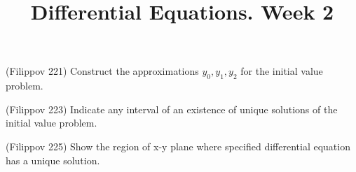 \documentclass[14pt]{exam}
\title{Differential Equations. Week 2}
\date{}
\begin{document}
	\maketitle
	
	\begin{questions}
		\question
		(Filippov 221) Construct the approximations $y_0, y_1, y_2$ for the initial value problem. 
		
		\question
		(Filippov 223) Indicate any interval of an existence of unique solutions of the initial value problem.
		
		\question
		(Filippov 225)
		Show the region of x-y plane where specified differential equation has a unique solution.
\end{questions}
\end{document}
